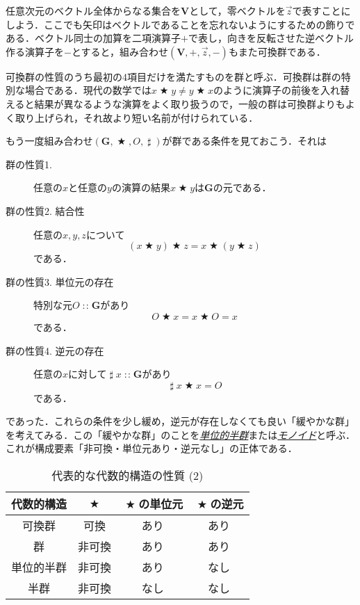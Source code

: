\documentclass[a5paper,draft]{jsbook}
\newcommand{\keyword}[1]{{\underline{\emph{#1}}}}
\newcommand{\mathSet}[1]{\mathbf{#1}} %
\newcommand{\mathVectorVar}[1]{\vec{#1}}
\newcommand{\mathUnaryOperator}[1]{\operatorname{#1}}
\newcommand{\mathInverse}{\mathUnaryOperator{\sharp}}
\newcommand{\mathBinaryOperator}[1]{\operatorname{#1}}
\newcommand{\mathAnyBinaryOperator}{\mathBinaryOperator{\bigstar}}
\newcommand{\mathIn}{\mathBinaryOperator{:\!:}}
\newcommand{\mathGroup}[4]{(#1,#2,#3,#4)}
\begin{document}
任意次元のベクトル全体からなる集合を$\mathSet{V}$として，零ベクトルを$\mathVectorVar{z}$で表すことにしよう．ここでも矢印はベクトルであることを忘れないようにするための飾りである．ベクトル同士の加算を二項演算子$+$で表し，向きを反転させた逆ベクトル作る演算子を$-$とすると，組み合わせ$\mathGroup{\mathSet{V}}{+}{\mathVectorVar{z}}{-}$もまた可換群である．

可換群の性質のうち最初の4項目だけを満たすものを群と呼ぶ．可換群は群の特別な場合である．現代の数学では$x\mathAnyBinaryOperator y\neq y\mathAnyBinaryOperator x$のように演算子の前後を入れ替えると結果が異なるような演算をよく取り扱うので，一般の群は可換群よりもよく取り上げられ，それ故より短い名前が付けられている．

もう一度組み合わせ$\mathGroup{\mathSet{G}}{\mathAnyBinaryOperator}{O}{\mathInverse}$が群である条件を見ておこう．それは
\begin{description}
\item[群の性質1.] 任意の$x$と任意の$y$の演算の結果$x\mathAnyBinaryOperator y$は$\mathSet{G}$の元である．
\item[群の性質2. 結合性] 任意の$x,y,z$について
\begin{equation}
(x\mathAnyBinaryOperator y)\mathAnyBinaryOperator z=x\mathAnyBinaryOperator(y\mathAnyBinaryOperator z)
\end{equation}
である．
\item[群の性質3. 単位元の存在] 特別な元$O\mathIn\mathSet{G}$があり
\begin{equation}
O\mathAnyBinaryOperator x=x\mathAnyBinaryOperator O=x
\end{equation}
である．
\item[群の性質4. 逆元の存在] 任意の$x$に対して$\mathInverse x\mathIn\mathSet{G}$があり
\begin{equation}
\mathInverse x\mathAnyBinaryOperator x=O
\end{equation}
である．
\end{description}
であった．これらの条件を少し緩め，逆元が存在しなくても良い「緩やかな群」を考えてみる．この「緩やかな群」のことを\keyword{単位的半群}または\keyword{モノイド}と呼ぶ．これが構成要素「非可換・単位元あり・逆元なし」の正体である．

\begin{table}
\caption{代表的な代数的構造の性質 (2)}
\label{tab:group-and-monoid}
\begin{center}
\begin{tabular}{||c||c|c|c||}
\hline
代数的構造&$\mathAnyBinaryOperator$&$\mathAnyBinaryOperator$の単位元&$\mathAnyBinaryOperator$の逆元\\
\hline\hline
可換群&可換&あり&あり\\
群&非可換&あり&あり\\
単位的半群&非可換&あり&なし\\
半群&非可換&なし&なし\\
\hline
\end{tabular}
\end{center}
\end{table}
\end{document}
